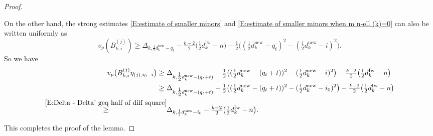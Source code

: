 \documentclass[12pt]{amsart}
\theoremstyle{definition}
\numberwithin{equation}{subsection}
\newcommand{\new}{\mathrm{new}}
\newcommand{\Iw}{\mathrm{Iw}}
\begin{document}
\begin{proof}
\begin{enumerate}
On the other hand, the strong estimates \eqref{E:estimate of smaller minors} and \eqref{E:estimate of smaller minors when m n-ell (k)=0} can also be written uniformly as
        \[
        v_p(B_{k,i}^{(j)})\geq \Delta_{k, \frac 12d_k^\new -q_t} - \tfrac{k-2}2\big( \tfrac 12d_k^\Iw-n\big) -\tfrac 12\big((\tfrac 12d_k^\new - q_t)^2 - (\tfrac 12d_k^\new-i)^2\big). 
        \]
        So we have 
		\begin{align*}
		v_p\big( B_{k,i}^{(j)} \eta_{(j), i_0-i}\big) 
		\geq  \ &\Delta_{k, \tfrac 12d_k^\new -(q_t+t)}-\tfrac 12\big((\tfrac 12d_k^\new -(q_t+t))^2- (\tfrac 12d_k^\new - i)^2\big) - \tfrac{k-2}2\big( \tfrac 12d_k^\Iw-n\big)
		\\
		\geq \ &\Delta_{k, \tfrac 12d_k^\new -(q_t+t)}-\tfrac 12\big((\tfrac 12d_k^\new -(q_t+t))^2- (\tfrac 12d_k^\new - i_0)^2\big) - \tfrac{k-2}2\big( \tfrac 12d_k^\Iw-n\big)
		\\ 
		\stackrel{\eqref{E:Delta - Delta' geq half of diff square}}\geq  & \Delta_{k, \frac 12d_k^\new -i_0} - \tfrac{k-2}2\big( \tfrac 12d_k^\Iw-n\big).
		\end{align*}
	\end{enumerate}
	This completes the proof of the lemma.
\end{proof}
\end{document}

